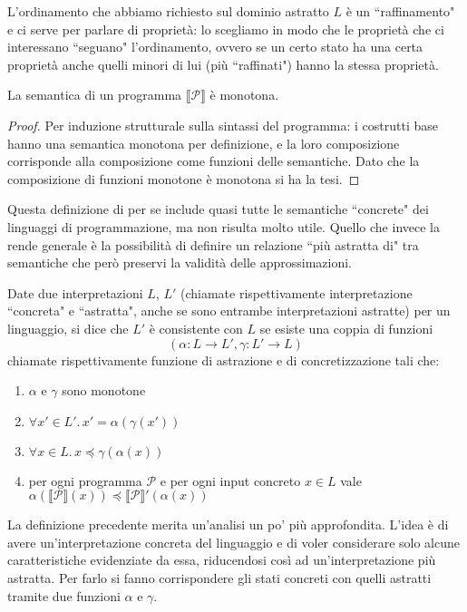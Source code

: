 \documentclass[12pt]{article}
\numberwithin{theorem}{subsection}
\begin{document}
L'ordinamento che abbiamo richiesto sul dominio astratto $L$ è un ``raffinamento" e ci serve per parlare di proprietà: lo scegliamo in modo che le proprietà che ci interessano ``seguano" l'ordinamento, ovvero se un certo stato ha una certa proprietà anche quelli minori di lui (più ``raffinati") hanno la stessa proprietà.

\begin{prop}
	La semantica di un programma $\llbracket \mathcal{P} \rrbracket$ è monotona.
\end{prop}
\begin{proof}
	Per induzione strutturale sulla sintassi del programma: i costrutti base hanno una semantica monotona per definizione, e la loro composizione corrisponde alla composizione come funzioni delle semantiche. Dato che la composizione di funzioni monotone è monotona si ha la tesi.
\end{proof}

Questa definizione di per se include quasi tutte le semantiche ``concrete" dei linguaggi di programmazione, ma non risulta molto utile. Quello che invece la rende generale è la possibilità di definire un relazione ``più astratta di" tra semantiche che però preservi la validità delle approssimazioni.

\begin{definition}
	Date due interpretazioni $L$, $L'$ (chiamate rispettivamente interpretazione ``concreta" e ``astratta", anche se sono entrambe interpretazioni astratte) per un linguaggio, si dice che $L'$ è consistente con $L$ se esiste una coppia di funzioni
	\[ (\alpha: L \rightarrow L', \gamma: L' \rightarrow L) \]
	chiamate rispettivamente funzione di astrazione e di concretizzazione tali che:
	\begin{enumerate}
		\item $\alpha$ e $\gamma$ sono monotone
		\item $\forall x' \in L'. \, x' = \alpha(\gamma(x'))$
		\item $\forall x \in L. \, x \preceq \gamma(\alpha(x))$
		\item per ogni programma $\mathcal{P}$ e per ogni input concreto $x \in L$ vale $\alpha(\llbracket \mathcal{P} \rrbracket(x)) \preceq \llbracket \mathcal{P} \rrbracket'(\alpha(x))$
	\end{enumerate}
\end{definition}

La definizione precedente merita un'analisi un po' più approfondita.
L'idea è di avere un'interpretazione concreta del linguaggio e di voler considerare solo alcune caratteristiche evidenziate da essa, riducendosi così ad un'interpretazione più astratta. Per farlo si fanno corrispondere gli stati concreti con quelli astratti tramite due funzioni $\alpha$ e $\gamma$.
\end{document}
